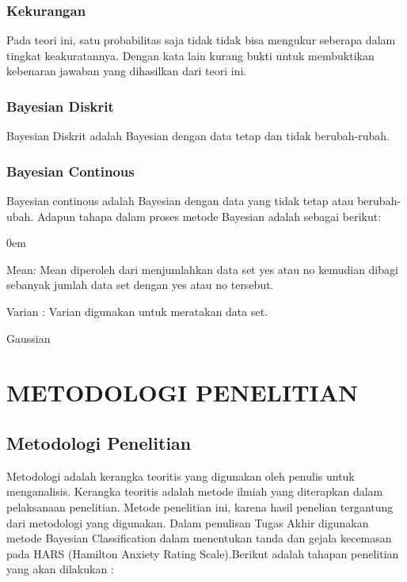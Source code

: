 \documentclass{jtetiproposalskripsi}
\begin{document}
\subsection{Kekurangan}
Pada teori ini, satu probabilitas saja tidak tidak bisa mengukur seberapa dalam tingkat keakuratannya. Dengan kata lain kurang bukti untuk membuktikan kebenaran jawaban yang dihasilkan dari teori ini.

\subsection{Bayesian Diskrit}
Bayesian Diskrit adalah Bayesian dengan data tetap dan tidak berubah-rubah. 


\subsection{Bayesian Continous}
Bayesian continous adalah Bayesian dengan data yang tidak tetap atau berubah-ubah. Adapun tahapa dalam proses metode Bayesian adalah sebagai berikut:
\begin{enumerate}[1.]
\begin{singlespace}
\itemsep0em
\item Mean:                   
	Mean diperoleh dari menjumlahkan data set yes atau no kemudian dibagi sebanyak jumlah data set dengan yes atau no tersebut. 

\item Varian :	
	Varian digunakan untuk meratakan data set.	 

\item Gaussian
\end{singlespace}
\end{enumerate} 



\chapter{METODOLOGI PENELITIAN}

\section{Metodologi Penelitian}
Metodologi adalah kerangka teoritis yang digunakan oleh penulis untuk menganalisis. Kerangka teoritis adalah metode ilmiah yang diterapkan dalam pelaksanaan penelitian. Metode penelitian ini, karena hasil penelian tergantung dari metodologi yang digunakan. Dalam penulisan Tugas Akhir digunakan metode Bayesian Classification dalam menentukan tanda dan gejala kecemasan pada HARS (Hamilton Anxiety Rating Scale).Berikut adalah tahapan penelitian yang akan dilakukan : 
\end{document}
